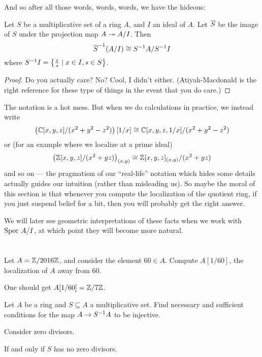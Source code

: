 And so after all those words, words, words, we have the hideous:
\begin{theorem}
	\label{thm:localization_commute_quotient}
	Let $S$ be a multiplicative set of a ring $A$,
	and $I$ an ideal of $A$.
	Let $\overline S$ be the image of $S$
	under the projection map $A \twoheadrightarrow A/I$.
	Then
	\[ {\overline S}^{-1} (A/I) \cong S^{-1} A / S^{-1} I \]
	where $S^{-1} I = \left\{ \frac{x}{s} \mid x \in I, s \in S \right\}$.
\end{theorem}
\begin{proof}
	Do you actually care? No? Cool, I didn't either.
	(Atiyah-Macdonald is the right reference for these
	type of things in the event that you do care.)
\end{proof}
The notation is a hot mess.
But when we do calculations in practice, we instead write
\[ \left( \mathbb C[x,y,z]/(x^2 + y^2 - z^2) \right)[1/x]
	\cong \mathbb C[x,y,z,1/x] / (x^2 + y^2 - z^2) \]
or (for an example where we localize at a prime ideal)
\[ \left( \mathbb Z[x,y,z]/ (x^2 + yz) \right)_{(x,y)}
	\cong \mathbb Z[x,y,z]_{(x,y)} / (x^2 + yz) \]
and so on --- the pragmatism of our ``real-life'' notation
which hides some details actually guides our intuition
(rather than misleading us).
So maybe the moral of this section is that whenever
you compute the localization of the quotient ring,
if you just suspend belief for a bit,
then you will probably get the right answer.

We will later see geometric interpretations of these facts
when we work with $\text{Spec } A/I$,
at which point they will become more natural.

\section{\problemhead}
\begin{problem}
	Let $A = \mathbb Z/2016\mathbb Z$, and consider the element $60 \in A$.
	Compute $A[1/60]$, the localization of $A$ away from $60$.
	\begin{sol}
		One should get $A[1/60] = \mathbb Z/7\mathbb Z$.
	\end{sol}
\end{problem}

\begin{problem}
	Let $A$ be a ring and $S \subseteq A$ a multiplicative set.
	Find necessary and sufficient conditions
	for the map $A \to S^{-1} A$ to be injective.
	\begin{hint}
		Consider zero divisors.
	\end{hint}
	\begin{sol}
		If and only if $S$ has no zero divisors.
	\end{sol}
\end{problem}

